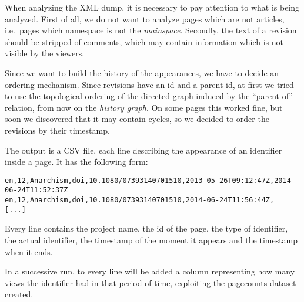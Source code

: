 When analyzing the XML dump, it is necessary to pay attention to what is being analyzed.
First of all, we do not want to analyze pages which are not articles, i.e.\ pages which namespace is not the \emph{mainspace}.
Secondly, the text of a revision should be stripped of comments, which may contain information which is not visible by the viewers.

Since we want to build the history of the appearances, we have to decide an ordering mechanism.
Since revisions have an id and a parent id, at first we tried to use the topological ordering of the directed graph induced by the ``parent of'' relation, from now on the \emph{history graph}.
On some pages this worked fine, but soon we discovered that it may contain cycles, so we decided to order the revisions by their timestamp.

The output is a CSV file, each line describing the appearance of an identifier inside a page.
It has the following form:
\begin{verbatim}
en,12,Anarchism,doi,10.1080/07393140701510,2013-05-26T09:12:47Z,2014-06-24T11:52:37Z
en,12,Anarchism,doi,10.1080/07393140701510,2014-06-24T11:56:44Z,
[...]
\end{verbatim}
Every line contains the project name, the id of the page, the type of identifier, the actual identifier, the timestamp of the moment it appears and the timestamp when it ends.

In a successive run, to every line will be added a column representing how many views the identifier had in that period of time, exploiting the pagecounts dataset created.
